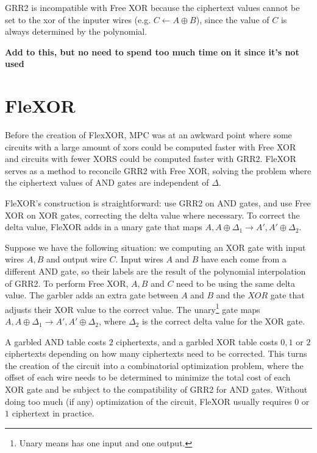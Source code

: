 \documentclass[12pt,twoside]{reedthesis}
\begin{document}
GRR2 is incompatible with Free XOR because the ciphertext values cannot be set to the xor of the inputer wires (e.g. $C \gets A \oplus B$), since the value of $C$ is always determined by the polynomial.

\textbf{Add to this, but no need to spend too much time on it since it's not used}


\section{FleXOR}
Before the creation of FlexXOR, MPC was at an awkward point where some circuits with a large amount of xors could be computed faster with Free XOR and circuits with fewer XORS could be computed faster with GRR2.
FleXOR serves as a method to reconcile GRR2 with Free XOR, solving the problem where the ciphertext values of AND gates are independent of $\Delta$.

FleXOR's construction is straightforward: use GRR2 on AND gates, and use Free XOR on XOR gates, correcting the delta value where necessary.
To correct the delta value, FleXOR adds in a unary gate that maps $A, A \oplus \Delta_1 \to A', A' \oplus \Delta_2$.

Suppose we have the following situation: we computing an XOR gate with input wires $A,B$ and output wire $C$.
Input wires $A$ and $B$ have each come from a different AND gate, so their labels are the result of the polynomial interpolation of GRR2.
To perform Free XOR, $A,B$ and $C$ need to be using the same delta value. 
The garbler adds an extra gate between $A$ and $B$ and the $XOR$ gate that adjusts their XOR value to the correct value.
The unary\footnote{Unary means has one input and one output.} gate maps $A,A \oplus \Delta_1 \to A', A' \oplus \Delta_2$, where $\Delta_2$ is the correct delta value for the XOR gate.

A garbled AND table costs $2$ ciphertexts, and a garbled XOR table costs $0,1$ or $2$ ciphertexts depending on how many ciphertexts need to be corrected.
This turns the creation of the circuit into a combinatorial optimization problem, where the offset of each wire needs to be determined to minimize the total cost of each XOR gate and be subject to the compatibility of GRR2 for AND gates.
Without doing too much (if any) optimization of the circuit, FleXOR usually requires $0$ or $1$ ciphertext in practice.
\end{document}
